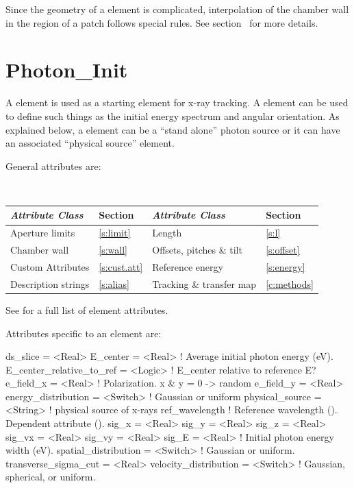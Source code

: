 {
Since the geometry of a  element is complicated, interpolation of the chamber wall in the
region of a patch follows special rules. See section~ for more details.

\section{Photon_Init}
\label{s:photon.init}

A  element is used as a starting element for x-ray
tracking.  A  element can be used to define such
things as the initial energy spectrum and angular orientation. As
explained below, a  element can be a ``stand alone''
photon source or it can have an associated ``physical source''
element.

General  attributes are:
\begin{center}
\tt
\begin{tabular}{llll} \toprule
  {\sl Attribute Class}      & Section           & {\sl Attribute Class}      & Section         \\ \midrule
  Aperture limits            & \ref{s:limit}     & Length                     & \ref{s:l}       \\
  Chamber wall               & \ref{s:wall}      & Offsets, pitches \& tilt   & \ref{s:offset}  \\
  Custom Attributes          & \ref{s:cust.att}  & Reference energy           & \ref{s:energy}  \\ 
  Description strings        & \ref{s:alias}     & Tracking \& transfer map   & \ref{c:methods} \\ 
  \bottomrule
\end{tabular}
\end{center}
\toffset
See  for a full list of element attributes.

Attributes specific to an  element are:
\begin{example}
  ds_slice                 = <Real>
  E_center                 = <Real>    ! Average initial photon energy (eV).
  E_center_relative_to_ref = <Logic>   ! E_center relative to reference E?
  e_field_x                = <Real>    ! Polarization. x & y = 0 -> random
  e_field_y                = <Real>
  energy_distribution      = <Switch>  ! Gaussian or uniform
  physical_source          = <String>  ! physical source of x-rays
  ref_wavelength                       ! Reference wavelength (). Dependent attribute ().
  sig_x                    = <Real>
  sig_y                    = <Real>
  sig_z                    = <Real>
  sig_vx                   = <Real>
  sig_vy                   = <Real>
  sig_E                    = <Real>    ! Initial photon energy width (eV).
  spatial_distribution     = <Switch>  ! Gaussian or uniform. 
  transverse_sigma_cut     = <Real>
  velocity_distribution    = <Switch>  ! Gaussian, spherical, or uniform. 
\end{example}

}
